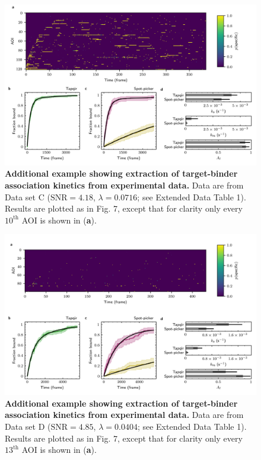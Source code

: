 \begin{figure}[t]
\centering
\includegraphics[width=\textwidth]{extended-data/figure5.png}
\caption{\textbf{Additional example showing extraction of target-binder association kinetics from experimental data.} Data are from Data set C ($\textrm{SNR} = 4.18$, $\lambda = 0.0716$; see Extended Data Table 1).  Results are plotted as in Fig. 7, except that for clarity only every $10^\mathrm{th}$ AOI is shown in (\textbf{a}).}
\label{fig:sigma54_298P2993}
\end{figure}
\clearpage
\pagebreak


\begin{figure}[t]
\centering
\includegraphics[width=\textwidth]{extended-data/figure6.png}
\caption{\textbf{Additional example showing extraction of target-binder association kinetics from experimental data.} Data are from Data set D ($\textrm{SNR} = 4.85$, $\lambda = 0.0404$; see Extended Data Table 1).  Results are plotted as in Fig. 7, except that for clarity only every $13^\mathrm{th}$ AOI is shown in (\textbf{a}).}
\label{fig:greb}
\end{figure}
\clearpage
\pagebreak

